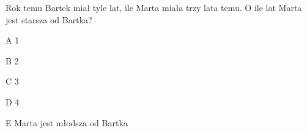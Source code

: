 \begin{tresc}
Rok temu Bartek miał tyle lat, ile Marta miała trzy lata temu. O ile lat Marta jest starsza od Bartka?
\end{tresc}
\begin{wariant}{A} 1 \end{wariant}
\begin{wariant}{B} 2 \end{wariant}
\begin{wariant}{C} 3 \end{wariant}
\begin{wariant}{D} 4 \end{wariant}
\begin{wariant}{E} Marta jest młodsza od Bartka \end{wariant}
